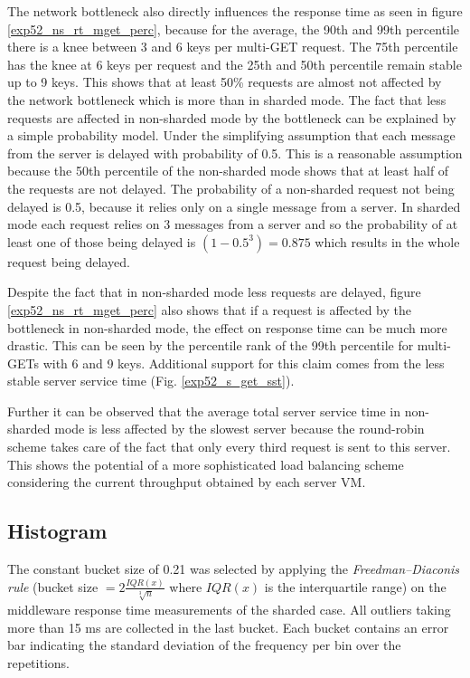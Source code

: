 \documentclass[report.tex]{subfiles}
\begin{document}
The network bottleneck also directly influences the response time as seen in figure \ref{exp52_ns_rt_mget_perc}, because for the average, the 90th and 99th percentile there is a knee between 3 and 6 keys per multi-GET request. The 75th percentile has the knee at 6 keys per request and the 25th and 50th percentile remain stable up to 9 keys. This shows that at least 50\% requests are almost not affected by the network bottleneck which is more than in sharded mode. The fact that less requests are affected in non-sharded mode by the bottleneck can be explained by a simple probability model.
Under the simplifying assumption that each message from the server is delayed with probability of 0.5. This is a reasonable assumption because the 50th percentile of the non-sharded mode shows that at least half of the requests are not delayed.
The probability of a non-sharded request not being delayed is 0.5, because it relies only on a single message from a server.
In sharded mode each request relies on 3 messages from a server and so the probability of at least one of those being delayed is $(1-0.5^3)=0.875$ which results in the whole request being delayed.

Despite the fact that in non-sharded mode less requests are delayed, figure \ref{exp52_ns_rt_mget_perc} also shows that if a request is affected by the bottleneck in non-sharded mode, the effect on response time can be much more drastic. This can be seen by the percentile rank of the 99th percentile for multi-GETs with 6 and 9 keys. Additional support for this claim comes from the less stable server service time (Fig. \ref{exp52_s_get_sst}).

Further it can be observed that the average total server service time in non-sharded mode is less affected by the slowest server because the round-robin scheme takes care of the fact that only every third request is sent to this server. This shows the potential of a more sophisticated load balancing scheme considering the current throughput obtained by each server VM.



\subsection{Histogram}


The constant bucket size of 0.21 was selected by applying the \emph{Freedman–Diaconis rule} (bucket size $ = 2 \frac{IQR(x)}{\sqrt[3]{n}}$ where $IQR(x)$ is the interquartile range) on the middleware response time measurements of the sharded case. All outliers taking more than 15 ms are collected in the last bucket. Each bucket contains an error bar indicating the standard deviation of the frequency per bin over the repetitions.
\end{document}
